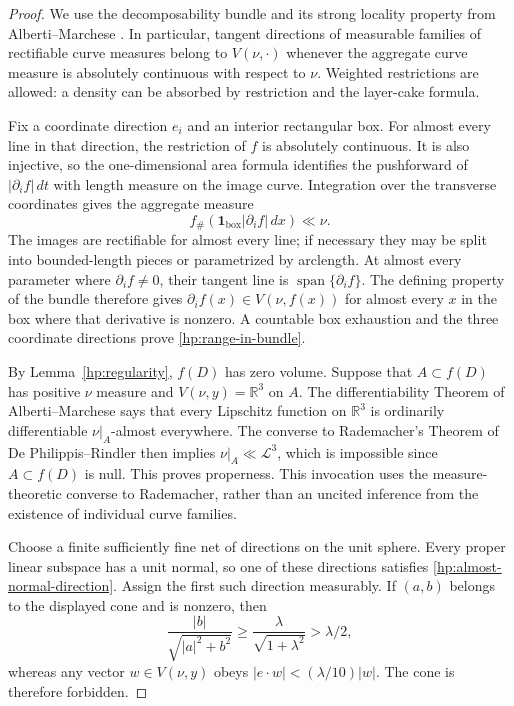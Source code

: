 \documentclass[11pt]{article}
\numberwithin{equation}{section}
\theoremstyle{definition}
\theoremstyle{remark}
\newcommand{\R}{\mathbb R}
\newcommand{\cL}{\mathcal L}
\begin{document}
\begin{proof}
We use the decomposability bundle and its strong locality property
from Alberti--Marchese \cite[Section~2.6 and Proposition~2.9(i)]
{AlbertiMarchese2016}.  In particular, tangent directions of measurable
families of rectifiable curve measures belong to $V(\nu,\cdot)$
whenever the aggregate curve measure is absolutely continuous with
respect to $\nu$.  Weighted restrictions are allowed: a density can
be absorbed by restriction and the layer-cake formula.

Fix a coordinate direction $e_i$ and an interior rectangular box.
For almost every line in that direction, the restriction of $f$ is
absolutely continuous.  It is also injective, so the one-dimensional
area formula identifies the pushforward of
$|\partial_i f|\,dt$ with length measure on the image curve.
Integration over the transverse coordinates gives the aggregate
measure
\[
 f_\#(\mathbf1_{\text{box}}|\partial_i f|\,dx)\ll\nu.
\]
The images are rectifiable for almost every line; if necessary they
may be split into bounded-length pieces or parametrized by arclength.
At almost every parameter where $\partial_i f\ne0$, their tangent
line is $\operatorname{span}\{\partial_i f\}$.  The defining property
of the bundle therefore gives
$\partial_i f(x)\in V(\nu,f(x))$ for almost every $x$ in the box
where that derivative is nonzero.  A countable box exhaustion and the
three coordinate directions prove \eqref{hp:range-in-bundle}.

By Lemma~\ref{hp:regularity}, $f(D)$ has zero volume.  Suppose that
$A\subset f(D)$ has positive $\nu$ measure and
$V(\nu,y)=\R^3$ on $A$.  The differentiability Theorem of
Alberti--Marchese \cite[Theorem~1.1(i)]{AlbertiMarchese2016} says that
every Lipschitz function on $\R^3$ is ordinarily differentiable
$\nu\vert_A$-almost everywhere.  The converse to Rademacher's Theorem
of De Philippis--Rindler \cite[Theorem~1.14]{DePhilippisRindler2016}
then implies $\nu\vert_A\ll\cL^3$, which is impossible since
$A\subset f(D)$ is null.  This proves properness.  This invocation
uses the measure-theoretic converse to Rademacher, rather than an
uncited inference from the existence of individual curve families.

Choose a finite sufficiently fine net of directions on the unit
sphere.  Every proper linear subspace has a unit normal, so one
of these directions satisfies \eqref{hp:almost-normal-direction}.
Assign the first such direction measurably.  If $(a,b)$ belongs to
the displayed cone and is nonzero, then
\[
 \frac{|b|}{\sqrt{|a|^2+b^2}}
 \ge\frac{\lambda}{\sqrt{1+\lambda^2}}>\lambda/2,
\]
whereas any vector $w\in V(\nu,y)$ obeys
$|e\cdot w|< (\lambda/10)|w|$.  The cone is therefore forbidden.
\end{proof}
\end{document}
